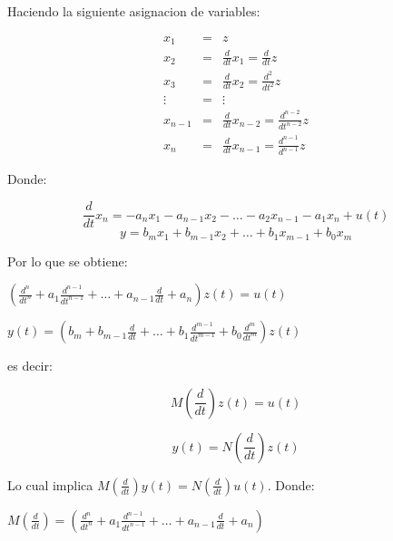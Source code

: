 Haciendo la siguiente asignacion de variables:

\begin{eqnarray}
x_1     & = & z \nonumber \\
x_2     & = & \frac{d}{dt} x_1 = \frac{d}{dt} z \nonumber \\
x_3     & = & \frac{d}{dt} x_2 = \frac{d^2}{dt^2} z \nonumber \\
\vdots  & = & \vdots \nonumber \\
x_{n-1} & = & \frac{d}{dt} x_{n-2} = \frac{d^{n-2}}{dt^{n-2}} z \nonumber \\
x_n     & = & \frac{d}{dt} x_{n-1} = \frac{d^{n-1}}{d^{n-1}} z \nonumber
\end{eqnarray}

Donde:

\begin{equation}
\frac{d}{dt} x_n = -a_n x_1 - a_{n-1} x_2 - \dots - a_2 x_{n-1} - a_1 x_n + u(t)
\end{equation}
\begin{equation}
y = b_m x_1 + b_{m-1} x_2 + \dots + b_1 x_{m-1} + b_0 x_m
\end{equation}

Por lo que se obtiene:

\begin{math}
\left( \frac{d^n}{dt^n} + a_1 \frac{d^{n-1}}{dt^{n-1}} + \dots + a_{n-1} \frac{d}{dt} + a_n \right) z(t) = u(t)
\end{math}

\begin{math}
y(t) = \left( b_m + b_{m-1} \frac{d}{dt} + \dots + b_1 \frac{d^{m-1}}{dt^{m-1}} + b_0 \frac{d^m}{dt^m} \right) z(t)
\end{math}

es decir:

\begin{equation}
M \left( \frac{d}{dt} \right) z(t) = u(t)
\end{equation}

\begin{equation}
y(t) = N \left( \frac{d}{dt} \right) z(t)
\end{equation}

Lo cual implica $M \left( \frac{d}{dt} \right) y(t) = N \left( \frac{d}{dt} \right) u(t)$. Donde:

\begin{math}
M \left( \frac{d}{dt} \right) = \left( \frac{d^n}{dt^n} + a_1 \frac{d^{n-1}}{dt^{n-1}} + \dots + a_{n-1} \frac{d}{dt} + a_n \right)
\end{math}

